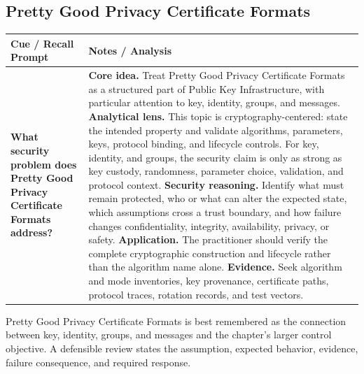 \documentclass[11pt]{article}
\newcommand{\CornellHeader}{%
\rowcolor{Navy}\color{white}\bfseries Cue / Recall Prompt & \color{white}\bfseries Notes / Analysis\\\hline}
\newcommand{\CornellRow}[2]{%
\cellcolor{CueGray}\RaggedRight\textbf{#1} & \RaggedRight #2\\\hline}
\begin{document}
\subsection*{Pretty Good Privacy Certificate Formats}
\begin{longtable}{>{\RaggedRight\arraybackslash}p{}|>{\RaggedRight\arraybackslash}p{}}
\CornellHeader
\CornellRow{What security problem does Pretty Good Privacy Certificate Formats address?}{\textbf{Core idea.} Treat Pretty Good Privacy Certificate Formats as a structured part of Public Key Infrastructure, with particular attention to key, identity, groups, and messages. \textbf{Analytical lens.} This topic is cryptography-centered: state the intended property and validate algorithms, parameters, keys, protocol binding, and lifecycle controls. For key, identity, and groups, the security claim is only as strong as key custody, randomness, parameter choice, validation, and protocol context. \textbf{Security reasoning.} Identify what must remain protected, who or what can alter the expected state, which assumptions cross a trust boundary, and how failure changes confidentiality, integrity, availability, privacy, or safety. \textbf{Application.} The practitioner should verify the complete cryptographic construction and lifecycle rather than the algorithm name alone. \textbf{Evidence.} Seek algorithm and mode inventories, key provenance, certificate paths, protocol traces, rotation records, and test vectors.}
\end{longtable}
\begin{topicsummary}
Pretty Good Privacy Certificate Formats is best remembered as the connection between key, identity, groups, and messages and the chapter's larger control objective. A defensible review states the assumption, expected behavior, evidence, failure consequence, and required response.
\end{topicsummary}
\end{document}
